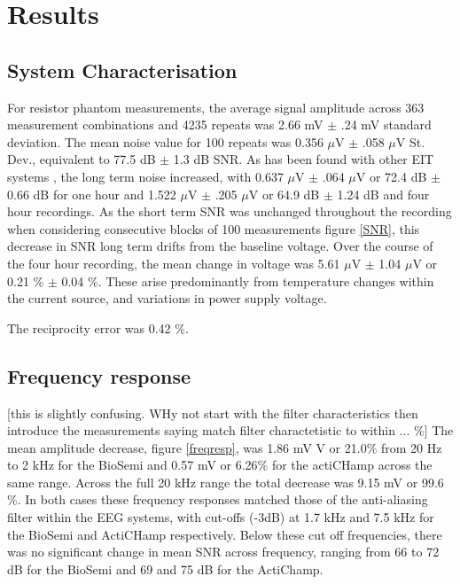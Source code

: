 \section{Results}
\subsection{System Characterisation}
For resistor phantom measurements, the average signal amplitude across 363 measurement combinations and 4235 repeats was 2.66 mV $\pm$ .24 mV standard deviation. The mean noise value for 100 repeats was 0.356 $\mu$V $\pm$ .058 $\mu$V St. Dev., equivalent to 77.5 dB $\pm$ 1.3 dB SNR. As has been found with other EIT systems \cite{oh2007multi}, the long term noise increased, with 0.637 $\mu$V $\pm$ .064 $\mu$V or 72.4 dB $\pm$ 0.66 dB for one hour and 1.522 $\mu$V $\pm$ .205 $\mu$V or 64.9 dB $\pm$ 1.24 dB and four hour recordings. As the short term SNR was unchanged throughout the recording when considering consecutive blocks of 100 measurements figure \ref{SNR}, this decrease in SNR 
long term drifts from the baseline voltage. Over the course of the four hour recording, the mean change in voltage was 5.61 $\mu$V $\pm$ 1.04 $\mu$V or 0.21 \% $\pm$ 0.04 \%. 
These arise predominantly from temperature changes within the current source, and variations in power supply voltage.

The reciprocity error was 0.42 \%. 



\subsection{Frequency response}
[this is slightly confusing. WHy not start with the filter characteristics then introduce the measurements saying match filter charactetistic to within ... \%] The mean amplitude decrease, figure \ref{freqresp}, was 1.86 mV V or 21.0\%  from 20 Hz to 2 kHz for the BioSemi and 0.57 mV or 6.26\% for the actiCHamp across the same range. Across the full 20 kHz range the total decrease was 9.15 mV or  99.6 \%.  In both cases these frequency responses matched those of the anti-aliasing filter within the EEG systems, with cut-offs (-3dB) at 1.7 kHz and 7.5 kHz for the BioSemi and ActiCHamp respectively. Below these cut off frequencies, there was no significant change in mean SNR across frequency, ranging from 66 to 72 dB for the BioSemi and 69 and 75 dB for the ActiChamp.  